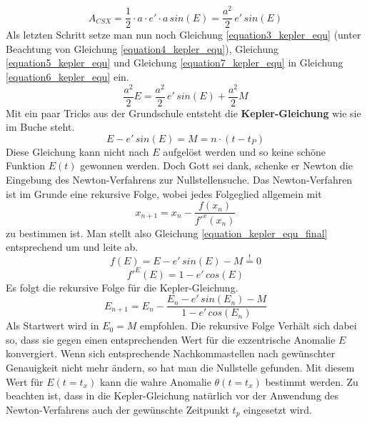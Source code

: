 \begin{equation}
	A_{CSX}=\frac{1}{2}\cdot a\cdot e' \cdot a\,sin(E)=\frac{a^2}{2}\,e'\,sin(E)
	\label{equation7_kepler_equ}
\end{equation}
Als letzten Schritt setze man nun noch Gleichung \ref{equation3_kepler_equ} (unter Beachtung von Gleichung \ref{equation4_kepler_equ}), Gleichung \ref{equation5_kepler_equ} und Gleichung \ref{equation7_kepler_equ} in Gleichung \ref{equation6_kepler_equ} ein.
\begin{equation}
	\frac{a^2}{2}E=\frac{a^2}{2}\,e'\,sin(E)+\frac{a^2}{2}M
	\label{equation8_kepler_equ}
\end{equation}
Mit ein paar Tricks aus der Grundschule entsteht die \textbf{Kepler-Gleichung} wie sie im Buche steht.
\begin{equation}
	E-e'\,sin(E)=M=n\cdot (t-t_P)
	\label{equation_kepler_equ_final}
\end{equation}
Diese Gleichung kann nicht nach \ensuremath{E} aufgelöst werden und so keine schöne Funktion \ensuremath{E(t)} gewonnen werden. Doch Gott sei dank, schenke er Newton die Eingebung des Newton-Verfahrens zur Nullstellensuche. Das Newton-Verfahren ist im Grunde eine rekursive Folge, wobei jedes Folgeglied allgemein mit
\begin{equation}
	x_{n+1}=x_n-\frac{f(x_n)}{f'^{x}(x_n)}
	\label{equation9_kepler_equ}
\end{equation}
zu bestimmen ist. Man stellt also Gleichung \ref{equation_kepler_equ_final} entsprechend um und leite ab.
\begin{equation}
	f(E)=E-e'\,sin(E)-M \stackrel{!}{=} 0
	\label{equation10_kepler_equ}
\end{equation}
\begin{equation}
	f'^{E}(E)=1-e'\,cos(E) 
	\label{equation11_kepler_equ}
\end{equation}
Es folgt die rekursive Folge für die Kepler-Gleichung. 
\begin{equation}
	E_{n+1}=E_n-\frac{E_n-e'\,sin(E_n)-M}{1-e'\,cos(E_n) }
	\label{equation12_kepler_equ}
\end{equation}
Als Startwert wird in \cite{HandRaum} \ensuremath{E_0=M} empfohlen. Die rekursive Folge Verhält sich dabei so, dass sie gegen einen entsprechenden Wert für die exzentrische Anomalie \ensuremath{E} konvergiert. Wenn sich entsprechende Nachkommastellen nach gewünschter Genauigkeit nicht mehr ändern, so hat man die Nullstelle gefunden. Mit diesem Wert für \ensuremath{E(t=t_x)} kann die wahre Anomalie \ensuremath{\theta(t=t_x)} bestimmt werden. Zu beachten ist, dass in die Kepler-Gleichung natürlich vor der Anwendung des Newton-Verfahrens auch der gewünschte Zeitpunkt \ensuremath{t_p} eingesetzt wird.     
